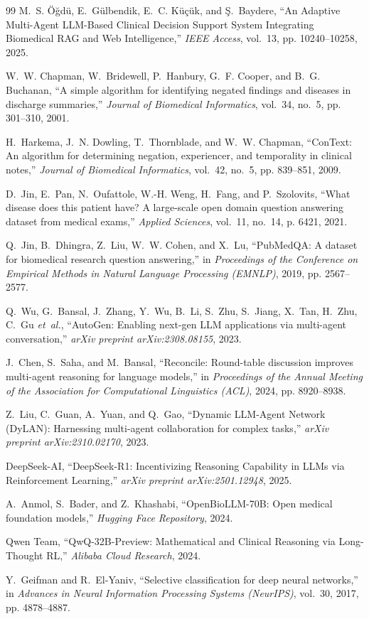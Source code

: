 \documentclass[conference]{IEEEtran}
\begin{document}
\begin{thebibliography}{99}
M.~S. {\"O}{\u{g}}d{\"u}, E.~G{\"u}lbendik, E.~C. K{\"u}{\c{c}}{\"u}k, and {\c{S}}.~Baydere, ``An Adaptive Multi-Agent LLM-Based Clinical Decision Support System Integrating Biomedical RAG and Web Intelligence,'' \emph{IEEE Access}, vol.~13, pp. 10240--10258, 2025.

W.~W. Chapman, W.~Bridewell, P.~Hanbury, G.~F. Cooper, and B.~G. Buchanan, ``A simple algorithm for identifying negated findings and diseases in discharge summaries,'' \emph{Journal of Biomedical Informatics}, vol.~34, no.~5, pp. 301--310, 2001.

H.~Harkema, J.~N. Dowling, T.~Thornblade, and W.~W. Chapman, ``ConText: An algorithm for determining negation, experiencer, and temporality in clinical notes,'' \emph{Journal of Biomedical Informatics}, vol.~42, no.~5, pp. 839--851, 2009.

D.~Jin, E.~Pan, N.~Oufattole, W.-H. Weng, H.~Fang, and P.~Szolovits, ``What disease does this patient have? A large-scale open domain question answering dataset from medical exams,'' \emph{Applied Sciences}, vol.~11, no.~14, p. 6421, 2021.

Q.~Jin, B.~Dhingra, Z.~Liu, W.~W. Cohen, and X.~Lu, ``PubMedQA: A dataset for biomedical research question answering,'' in \emph{Proceedings of the Conference on Empirical Methods in Natural Language Processing (EMNLP)}, 2019, pp. 2567--2577.

Q.~Wu, G.~Bansal, J.~Zhang, Y.~Wu, B.~Li, S.~Zhu, S.~Jiang, X.~Tan, H.~Zhu, C.~Gu \emph{et~al.}, ``AutoGen: Enabling next-gen LLM applications via multi-agent conversation,'' \emph{arXiv preprint arXiv:2308.08155}, 2023.

J.~Chen, S.~Saha, and M.~Bansal, ``Reconcile: Round-table discussion improves multi-agent reasoning for language models,'' in \emph{Proceedings of the Annual Meeting of the Association for Computational Linguistics (ACL)}, 2024, pp. 8920--8938.

Z.~Liu, C.~Guan, A.~Yuan, and Q.~Gao, ``Dynamic LLM-Agent Network (DyLAN): Harnessing multi-agent collaboration for complex tasks,'' \emph{arXiv preprint arXiv:2310.02170}, 2023.

{DeepSeek-AI}, ``DeepSeek-R1: Incentivizing Reasoning Capability in LLMs via Reinforcement Learning,'' \emph{arXiv preprint arXiv:2501.12948}, 2025.

A.~Anmol, S.~Bader, and Z.~Khashabi, ``OpenBioLLM-70B: Open medical foundation models,'' \emph{Hugging Face Repository}, 2024.

{Qwen Team}, ``QwQ-32B-Preview: Mathematical and Clinical Reasoning via Long-Thought RL,'' \emph{Alibaba Cloud Research}, 2024.

Y.~Geifman and R.~El-Yaniv, ``Selective classification for deep neural networks,'' in \emph{Advances in Neural Information Processing Systems (NeurIPS)}, vol.~30, 2017, pp. 4878--4887.

\end{thebibliography}
\end{document}
